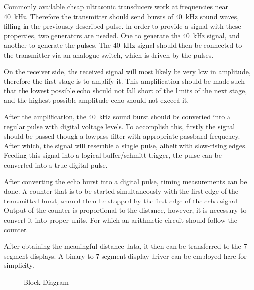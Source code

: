 \documentclass[12pt, a4paper]{article}
\begin{document}
        \bigskip
        Commonly available cheap ultrasonic transducers work at frequencies near \SI{40}{\kilo\hertz}. Therefore the transmitter should send bursts of \SI{40}{\kilo\hertz} sound waves, filling in the previously described pulse. In order to provide a signal with these properties, two generators are needed. One to generate the \SI{40}{\kilo\hertz} signal, and another to generate the pulses. The \SI{40}{\kilo\hertz} signal should then be connected to the transmitter via an analogue switch, which is driven by the pulses.

        \pagebreak
        On the receiver side, the received signal will most likely be very low in amplitude, therefore the first stage is to amplify it. This amplification should be made such that the lowest possible echo should not fall short of the limits of the next stage, and the highest possible amplitude echo should not exceed it.
        
        \bigskip
        After the amplification, the \SI{40}{\kilo\hertz} sound burst should be converted into a regular pulse with digital voltage levels. To accomplish this, firstly the signal should be passed though a lowpass filter with appropriate passband frequency. After which, the signal will resemble a single pulse, albeit with slow-rising edges. Feeding this signal into a logical buffer/schmitt-trigger, the pulse can be converted into a true digital pulse. 

        \bigskip
        After converting the echo burst into a digital pulse, timing measurements can be done. A counter that is to be started simultaneously with the first edge of the transmitted burst, should then be stopped by the first edge of the echo signal. Output of the counter is proportional to the distance, however, it is necessary to convert it into proper units. For which an arithmetic circuit should follow the counter.

        \bigskip
        After obtaining the meaningful distance data, it then can be transferred to the 7-segment displays. A binary to 7 segment display driver can be employed here for simplicity.

        \pagebreak
        \begin{landscape}\centering
            \vspace*{1.8cm}
            \begin{figure}[H]\centering
                \caption{Block Diagram}
            \end{figure}
        \end{landscape}
        \vfill
        \pagebreak
\end{document}
